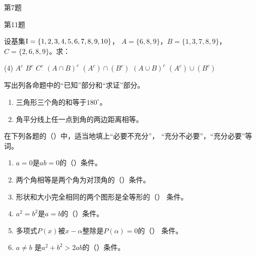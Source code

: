 \begin{Exercise}[复习题]
\begin{question}
\begin{figurehere}
    \begin{minipage}[b]{0.48\linewidth}
    \centering
{}
	\caption*{第7题}
    \end{minipage}
    \begin{minipage}[b]{0.48\linewidth}
    \centering
    \begin{tikzpicture}[>=latex, scale=1]
    \end{tikzpicture}
	\caption*{第11题}
    \end{minipage}
    \end{figurehere}

\item 设基集${\rm I}=\{1,2,3,4,5,6,7,8,9,10\}$，
$A=\{6,8,9\}$，$B=\{ 1, 3, 7,8,9\}$，
$C=\{2,6,8,9\}$。求：
\begin{tasks}(4)
	\task $A^c$
	\task $B^c$
	\task $C^c$
	\task $(A\cap B)^c$
	\task $(A^c)\cap (B^c)$
	\task $(A\cup B)^c$
	\task $(A^c)\cup (B^c)$
\end{tasks}	

\item 写出列各命题中的“已知”部分和“求证”部分。
\begin{enumerate}
	\item 三角形三个角的和等于$180^{\circ}$。
	\item 角平分线上任一点到角的两边距离相等。
\end{enumerate}

\item 在下列各题的（\qquad）中，适当地填上“必要不充分”，
“充分不必要”，“充分必要”等词。
\begin{enumerate}
	\item $a=0$是$ab=0$的（\qquad）条件。
	\item 两个角相等是两个角为对顶角的（\qquad）条件。
	\item 形状和大小完全相同的两个图形是全等形的（\qquad）
	条件。
	\item $a^2=b^2$是$a=b$的（\qquad）条件。
	\item 多项式$P(x)$被$x-\alpha$整除是$P(\alpha)=0$的（\qquad）
	条件。
	\item $a\ne b$ 是$a^2+b^2>2ab$的（\qquad）条件。
\end{enumerate}


\end{question}
\end{Exercise}
